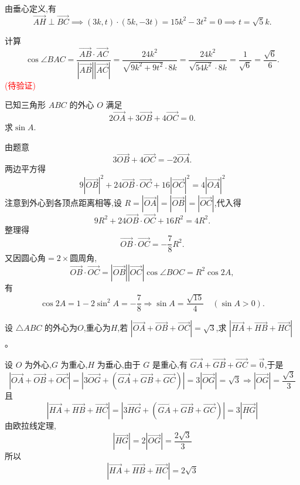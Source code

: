\begin{questions}
\begin{solution}
由垂心定义,有
\[
\overrightarrow{AH} \perp \overrightarrow{BC} \implies (3k,t) \cdot (5k, -3t) = 15k^2 - 3t^2 = 0 \implies t = \sqrt{5}k.
\]

计算
\[
\cos \angle BAC = \frac{\overrightarrow{AB} \cdot \overrightarrow{AC}}{|\overrightarrow{AB}||\overrightarrow{AC}|} = \frac{24k^2}{\sqrt{9k^2 + 9t^2} \cdot 8k} = \frac{24k^2}{\sqrt{54k^2} \cdot 8k} = \frac{1}{\sqrt{6}} = \frac{\sqrt{6}}{6}.
\]
\textcolor{red}{(待验证)}
\end{solution}

    \question 已知三角形 \(ABC\) 的外心 \(O\) 满足
    \[
    2\overrightarrow{OA}+3\overrightarrow{OB}+4\overrightarrow{OC}=0.
    \]
    求\(\sin A\).
    \begin{solution}
        由题意
        \[        
        3\overrightarrow{OB}+4\overrightarrow{OC}=-2\overrightarrow{OA}.
        \]
        两边平方得
        \[        
        9|\overrightarrow{OB}|^2+24\overrightarrow{OB}\cdot\overrightarrow{OC}+16|\overrightarrow{OC}|^2=4|\overrightarrow{OA}|^2
        \]
        注意到外心到各顶点距离相等,设 \(R=|\overrightarrow{OA}|=|\overrightarrow{OB}|=|\overrightarrow{OC}|\),代入得
        \[        
        9R^2+24\overrightarrow{OB}\cdot\overrightarrow{OC}+16R^2=4R^2.
        \]
        整理得
        \[
        \overrightarrow{OB}\cdot\overrightarrow{OC}=-\frac{7}{8}R^2.
        \]
        $\text{又因圆心角}=2\times\text{圆周角}$,
        \[        
        \overrightarrow{OB}\cdot\overrightarrow{OC}=|\overrightarrow{OB}||\overrightarrow{OC}|\cos\angle BOC=R^2\cos 2A,
        \]
        有
        \[
        \cos 2A=1-2\sin^2A=-\frac{7}{8}
        \Rightarrow \sin A=\frac{\sqrt{15}}{4}\quad(\sin A>0).
        \]
    \end{solution}
    
    \question 设 $\triangle ABC$ 的外心为$O$,重心为$H$,若 $|\overrightarrow{OA}+\overrightarrow{OB}+\overrightarrow{OC}|=\sqrt{3}$,求 $|\overrightarrow{HA}+\overrightarrow{HB}+\overrightarrow{HC}|$。
    \begin{solution}
        设 $O$ 为外心,$G$ 为重心,$H$ 为垂心,由于 $G$ 是重心,有 $\overrightarrow{GA} + \overrightarrow{GB} + \overrightarrow{GC} = \overrightarrow{0}$,于是
        \[
        |\overrightarrow{OA} + \overrightarrow{OB} + \overrightarrow{OC}| 
        = |3\overrightarrow{OG} + (\overrightarrow{GA} + \overrightarrow{GB} + \overrightarrow{GC})|=3|\overrightarrow{OG}| = \sqrt{3} \Rightarrow |\overrightarrow{OG}| = \frac{\sqrt{3}}{3}
        \]
        且
        \[
        |\overrightarrow{HA} + \overrightarrow{HB} + \overrightarrow{HC}|
        = |3\overrightarrow{HG} + (\overrightarrow{GA} + \overrightarrow{GB} + \overrightarrow{GC})|
        = 3|\overrightarrow{HG}|
        \]
        由欧拉线定理,
        \[
        |\overrightarrow{HG}| = 2|\overrightarrow{OG}| = \frac{2\sqrt{3}}{3}
        \]
        所以
        \[
        |\overrightarrow{HA} + \overrightarrow{HB} + \overrightarrow{HC}| = 2\sqrt{3}
        \]
    \end{solution}


\end{questions}

